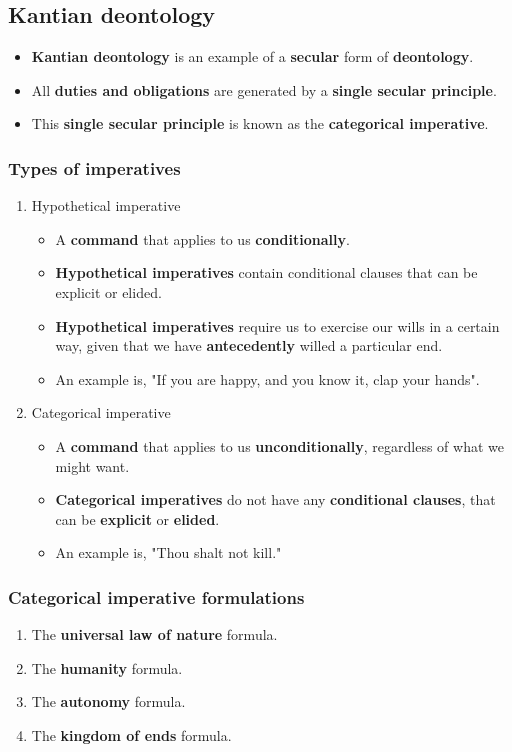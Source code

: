 \documentclass[11pt]{article}
\begin{document}
\subsection{Kantian deontology}
\label{sec:org2f7a1df}
\begin{itemize}
\item \textbf{Kantian deontology} is an example of a \textbf{secular} form of \textbf{deontology}.
\item All \textbf{duties and obligations} are generated by a \textbf{single secular principle}.
\item This \textbf{single secular principle} is known as the \textbf{categorical imperative}.
\end{itemize}

 \newpage
\subsubsection{Types of imperatives}
\label{sec:orgc4e6798}
\begin{enumerate}
\item Hypothetical imperative
\begin{itemize}
\item A \textbf{command} that applies to us \textbf{conditionally}.
\item \textbf{Hypothetical imperatives} contain conditional clauses that can be explicit or elided.
\item \textbf{Hypothetical imperatives} require us to exercise our wills in a certain way, given that we have \textbf{antecedently} willed a particular end.
\item An example is, "If you are happy, and you know it, clap your hands".
\end{itemize}
\item Categorical imperative
\begin{itemize}
\item A \textbf{command} that applies to us \textbf{unconditionally}, regardless of what we might want.
\item \textbf{Categorical imperatives} do not have any \textbf{conditional clauses}, that can be \textbf{explicit} or \textbf{elided}.
\item An example is, "Thou shalt not kill."
\end{itemize}
\end{enumerate}
\subsubsection{Categorical imperative formulations}
\label{sec:orgcca19b3}
\begin{enumerate}
\item The \textbf{universal law of nature} formula.
\item The \textbf{humanity} formula.
\item The \textbf{autonomy} formula.
\item The \textbf{kingdom of ends} formula.
\end{enumerate}
\end{document}
